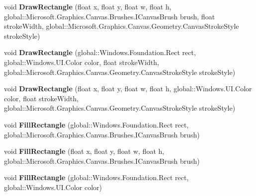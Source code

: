 \begin{DoxyCompactItemize}
void {\bfseries Draw\+Rectangle} (float x, float y, float w, float h, global\+::\+Microsoft.\+Graphics.\+Canvas.\+Brushes.\+I\+Canvas\+Brush brush, float stroke\+Width, global\+::\+Microsoft.\+Graphics.\+Canvas.\+Geometry.\+Canvas\+Stroke\+Style stroke\+Style)
\item 
\mbox{\label{interface_microsoft_1_1_graphics_1_1_canvas_1_1_i_canvas_drawing_session_a44f123ddca8e9582ef8859358cb43c33}} 
void {\bfseries Draw\+Rectangle} (global\+::\+Windows.\+Foundation.\+Rect rect, global\+::\+Windows.\+U\+I.\+Color color, float stroke\+Width, global\+::\+Microsoft.\+Graphics.\+Canvas.\+Geometry.\+Canvas\+Stroke\+Style stroke\+Style)
\item 
\mbox{\label{interface_microsoft_1_1_graphics_1_1_canvas_1_1_i_canvas_drawing_session_a076b55543b9248eaf8df01b43faaae55}} 
void {\bfseries Draw\+Rectangle} (float x, float y, float w, float h, global\+::\+Windows.\+U\+I.\+Color color, float stroke\+Width, global\+::\+Microsoft.\+Graphics.\+Canvas.\+Geometry.\+Canvas\+Stroke\+Style stroke\+Style)
\item 
\mbox{\label{interface_microsoft_1_1_graphics_1_1_canvas_1_1_i_canvas_drawing_session_aad333fe9cc512391f9d24c3f715ed511}} 
void {\bfseries Fill\+Rectangle} (global\+::\+Windows.\+Foundation.\+Rect rect, global\+::\+Microsoft.\+Graphics.\+Canvas.\+Brushes.\+I\+Canvas\+Brush brush)
\item 
\mbox{\label{interface_microsoft_1_1_graphics_1_1_canvas_1_1_i_canvas_drawing_session_a2a2999da33b0d1f6811b4606a6eb61c3}} 
void {\bfseries Fill\+Rectangle} (float x, float y, float w, float h, global\+::\+Microsoft.\+Graphics.\+Canvas.\+Brushes.\+I\+Canvas\+Brush brush)
\item 
\mbox{\label{interface_microsoft_1_1_graphics_1_1_canvas_1_1_i_canvas_drawing_session_af900874c2935bdf5765d740b10e6db49}} 
void {\bfseries Fill\+Rectangle} (global\+::\+Windows.\+Foundation.\+Rect rect, global\+::\+Windows.\+U\+I.\+Color color)
\item 

\end{DoxyCompactItemize}
